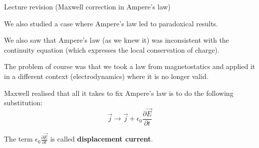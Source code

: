 \begin{frame}{Lecture \summarizedlecture revision (Maxwell correction in Ampere's law)}

We also studied a case where Ampere's law led to paradoxical results.\\

\vspace{0.2cm}

We also saw that Ampere's law (as we knew it) was inconsistent with
the continuity equation (which expresses the local conservation of charge).\\

\vspace{0.2cm}

The problem of course was that we took a law from magnetostatics and
applied it in a different context (electrodynamics) where it is no longer valid.

\vspace{0.2cm}

Maxwell realised that all it takes to fix Ampere's law is to do the following substitution:
\begin{equation*}
  \vec{j} \rightarrow
  \vec{j} + \epsilon_0 \frac{\partial \vec{E}}{\partial t}
\end{equation*}

The term $\displaystyle \epsilon_0 \frac{\partial \vec{E}}{\partial t}$
is called {\bf displacement current}.

\end{frame}

%
%
%

